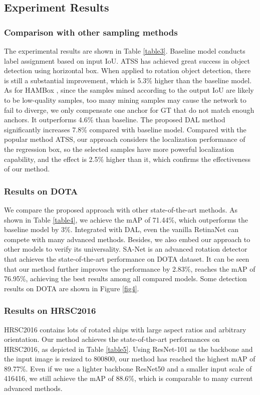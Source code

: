 \documentclass[letterpaper]{article} \usepackage{aaai21}  \usepackage{times}  \usepackage{helvet} \usepackage{courier}  \usepackage[hyphens]{url}  \usepackage{graphicx} \urlstyle{rm} \def\UrlFont{\rm}  \usepackage{natbib}  \usepackage{caption} \frenchspacing  \setlength{\pdfpagewidth}{8.5in}  \setlength{\pdfpageheight}{11in}  \usepackage{url}
\begin{document}
\subsection{Experiment Results} 
\subsubsection{Comparison with other sampling methods}
The experimental results are shown in Table \ref{table3}. Baseline model conducts label assignment  based on input IoU. ATSS \cite{zhang2020bridging} has achieved great success in object detection using horizontal box. When applied to rotation object detection, there is still a substantial improvement, which is 5.3\% higher than the baseline model. As for HAMBox \cite{liu2020hambox},  since the samples mined according to the output IoU are likely to be low-quality samples, too many mining samples may cause the network to fail to diverge, we only compensate one anchor for GT that do not match enough anchors. It outperforms 4.6\% than baseline. The proposed DAL method significantly increases 7.8\% compared with baseline model. Compared with the popular method ATSS, our approach considers the localization performance of the regression box, so the selected samples have more powerful localization capability, and the effect is 2.5\% higher than it, which confirms the effectiveness of our method.
\subsubsection{Results on DOTA}
We compare the proposed approach with other state-of-the-art methods. As shown in Table \ref{table4}, we achieve the mAP of 71.44\%, which outperforms the baseline model by 3\%. Integrated with DAL, even the vanilla RetinaNet can compete with many advanced methods. Besides, we also embed our approach to other models to verify its universality. SA-Net \cite{han2020align} is an advanced rotation detector that achieves the state-of-the-art performance on DOTA dataset. It can be seen that our method further improves the performance by 2.83\%, reaches the mAP of 76.95\%, achieving the best results among all compared models. Some detection results on DOTA are shown in Figure  \ref{fig4}. 
\subsubsection{Results on HRSC2016}
HRSC2016 contains lots of rotated ships with large aspect ratios and arbitrary orientation. Our method achieves the state-of-the-art performances on HRSC2016, as depicted in Table \ref{table5}. Using ResNet-101 as the backbone and the input image is resized to 800800, our method has reached the highest mAP of 89.77\%. Even if we use a lighter backbone ResNet50 and a smaller input scale of 416416, we still achieve the mAP of 88.6\%, which is comparable to many current advanced methods. 
\end{document}
